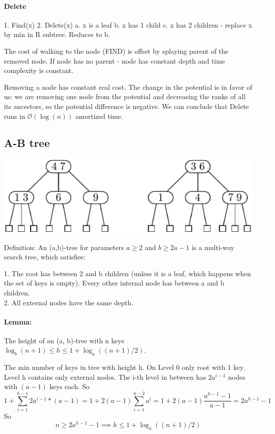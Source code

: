 \documentclass[12pt]{article}
\newcommand{\bigO}{\mathcal{O}}
\newcommand{\bigOlog}{\bigO(\log(n))}
\begin{document}
\paragraph{Delete}

1. Find(x)
2. Delete(x)
	a. x is a leaf
	b. x has 1 child
	c. x has 2 children - replace x by min in R subtree. Reduces to b.

The cost of walking to the node (FIND) is offset by splaying parent of the removed node. If node has no parent - node has constant depth and time complexity is constant.

Removing a node has constant real cost. The change in the potential is in favor of us: we are removing one node from the potential and decreasing the ranks of all its ancestors, so the potential difference is negative.
We can conclude that Delete runs in $\bigOlog$ amortized time.

\subsection{A-B tree}
\includegraphics[scale=0.5]{a_b_tree.eps}

Definition: An (a,b)-tree for parameters $a \geq 2$ and $b \geq 2a - 1$ is a multi-way search tree, which satisfies:

1. The root has between 2 and b children (unless it is a leaf, which happens when the set of keys is empty). Every other internal node has between a and b children. \\
2. All external nodes have the same depth.

\paragraph{Lemma:} The height of an (a, b)-tree with n keys $  \log_b(n + 1) \leq h \leq 1 + \log_a ((n + 1)/2)$.

The min number of keys in tree with height h. On Level 0 only root with 1 key. Level h contains only external nodes. The i-th level in between has $2a^{i-1}$ nodes with $(a-1)$ keys each. So
\[ 1 + \sum_{i=1}^{h-1} 2a^{i-1} * (a - 1) = 1 + 2(a-1) \sum_{i=1}^{h-2} a^i = 1 + 2(a-1) \frac{a^{h-1} - 1}{a-1} = 2a^{h-1} - 1 \]
So
\[ n \geq 2a^{h-1} - 1 \implies h \leq 1 + \log_a ((n + 1)/2) \]
\end{document}
